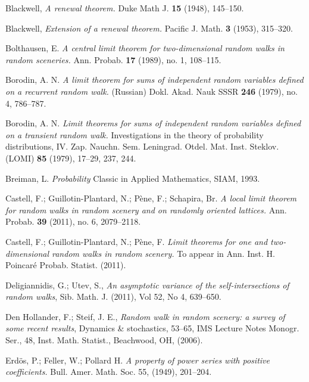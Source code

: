 \documentclass[oneside, a4paper,11pt,reqno]{amsart}
\begin{document}
\begin{thebibliography}{00}

 Blackwell, {\em A renewal theorem.} Duke Math J. {\bf 15} (1948), 145--150.

 Blackwell, {\em Extension of a renewal theorem.} Pacific J. Math. {\bf 3} (1953), 315--320.

Bolthausen, E. 
{\em A central limit theorem for two-dimensional random walks 
in random sceneries.}
Ann. Probab. {\bf 17} (1989), no. 1, 108--115.

Borodin, A. N. 
{\em A limit theorem for sums of independent random variables defined 
on a recurrent random walk.}
 (Russian)  Dokl. Akad. Nauk SSSR  {\bf 246}  (1979), no. 4, 786--787. 

 Borodin, A. N. {\em Limit theorems for sums of independent 
random variables defined on a transient random walk.} Investigations in the theory 
of probability distributions, IV. Zap. Nauchn. Sem. Leningrad. Otdel. Mat. Inst. Steklov. 
(LOMI) {\bf 85} (1979), 17--29, 237, 244.

 

 

 Breiman, L. {\em Probability} Classic in Applied Mathematics, SIAM, 1993.

 Castell, F.; Guillotin-Plantard, N.; P\`ene, F.; Schapira, Br. 
{\em A local limit theorem for random walks in random scenery and on randomly oriented lattices.} 
Ann. Probab. {\bf 39} (2011), no. 6, 2079--2118.

 Castell, F.; Guillotin-Plantard, N.; P\`ene, F. 
{\em Limit theorems for one and two-dimensional random walks in random scenery.} 
To appear in  Ann. Inst. H. Poincar\'e Probab. Statist. (2011).

 

 
  
  
  
  

 Deligiannidis, G.; Utev, S., {\em An asymptotic variance of the self-intersections of random walks}, Sib. Math. J. (2011), Vol 52, No 4, 639--650.

 Den Hollander, F.; Steif, J. E., {\em Random walk in random scenery: a survey of some recent results}, Dynamics \& stochastics, 53--65, 
IMS Lecture Notes Monogr. Ser., 48, Inst. Math. Statist., Beachwood, OH, (2006).

 Erd\" {o}s, P.; Feller, W.; Pollard H. {\em A property of power series with positive coefficients.} Bull. Amer. Math. Soc. 55, (1949), 201--204.


\end{thebibliography}
\end{document}
